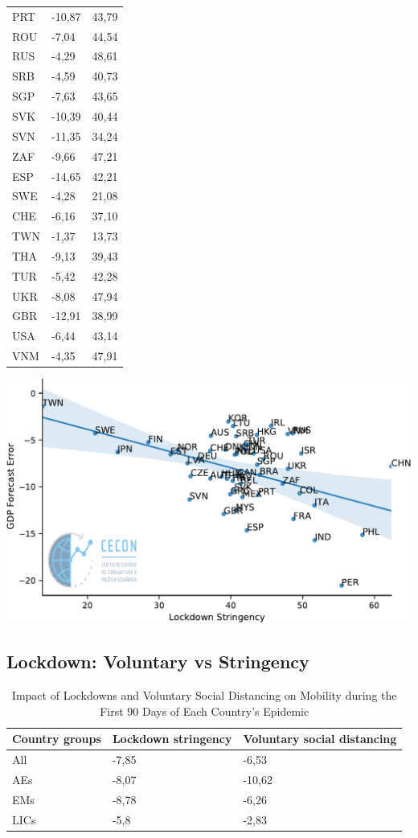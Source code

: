 \documentclass{SelfArx}
\begin{document}
\begin{table}[htbp]
\begin{tabular}{lll}
PRT & -10,87 & 43,79\\
ROU & -7,04 & 44,54\\
RUS & -4,29 & 48,61\\
SRB & -4,59 & 40,73\\
SGP & -7,63 & 43,65\\
SVK & -10,39 & 40,44\\
SVN & -11,35 & 34,24\\
ZAF & -9,66 & 47,21\\
ESP & -14,65 & 42,21\\
SWE & -4,28 & 21,08\\
CHE & -6,16 & 37,10\\
TWN & -1,37 & 13,73\\
THA & -9,13 & 39,43\\
TUR & -5,42 & 42,28\\
UKR & -8,08 & 47,94\\
GBR & -12,91 & 38,99\\
USA & -6,44 & 43,14\\
VNM & -4,35 & 47,91\\
\hline
\end{tabular}
\end{table}


\begin{center}
\includegraphics[width=.9\linewidth]{./figs/IMF/GDP_Lockdown.pdf}
\end{center}



\subsection*{Lockdown: Voluntary vs Stringency}
\label{sec:orga32943f}

\begin{table}[htbp]
\caption{\label{Vol_String}Impact of Lockdowns and Voluntary Social Distancing on Mobility during the First 90 Days of Each Country’s Epidemic}
\centering
\begin{tabular}{lll}
Country groups & Lockdown stringency & Voluntary social distancing\\
\hline
All & -7,85 & -6,53\\
AEs & -8,07 & -10,62\\
EMs & -8,78 & -6,26\\
LICs & -5,8 & -2,83\\
\hline
\end{tabular}
\end{table}
\end{document}
